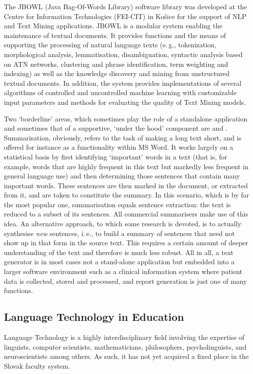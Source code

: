 \begin{multicols}{2}
The JBOWL (Java Bag-Of-Words Library) software library was developed at the Centre for Information Technologies (FEI-CIT) in Košice for the support of NLP and Text Mining applications. JBOWL is a modular system enabling the maintenance of textual documents. It provides functions and the means of supporting the processing of natural language texts (e.\,g., tokenization, morphological analysis, lemmatisation, disambiguation, syntactic analysis based on ATN networks, clustering and phrase identification, term weighting and indexing) as well as the knowledge discovery and mining from unstructured textual documents. In addition, the system provides implementations of several algorithms of controlled and uncontrolled machine learning with customizable input parameters and methods for evaluating the quality of Text Mining models.


Two ‘borderline’ areas, which sometimes play the role of a standalone application and sometimes that of a supportive, ‘under the hood’ component are  and . Summarisation, obviously, refers to the task of making a long text short, and is offered for instance as a functionality within MS Word. It works largely on a statistical basis by first identifying ‘important’ words in a text (that is, for example, words that are highly frequent in this text but markedly less frequent in general language use) and then determining those sentences that contain many important words. These sentences are then marked in the document, or extracted from it, and are taken to constitute the summary. In this scenario, which is by far the most popular one, summarisation equals sentence extraction: the text is reduced to a subset of its sentences. All commercial summarisers make use of this idea. An alternative approach, to which some research is devoted, is to actually synthesise \emph{new} sentences, i.\,e., to build a summary of sentences that need not show up in that form in the source text. This requires a certain amount of deeper understanding of the text and therefore is much less robust. All in all, a text generator is in most cases not a stand-alone application but embedded into a larger software environment such as a clinical information system where patient data is collected, stored and processed, and report generation is just one of many functions.

\subsection{Language Technology in Education}
Language Technology is a highly interdisciplinary field involving the expertise of linguists, computer scientists, mathematicians, philosophers, psycholinguists, and neuroscientists among others. As such, it has not yet acquired a fixed place in the Slovak faculty system.


\end{multicols}
